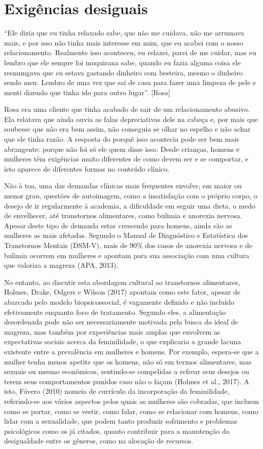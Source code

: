 \section{Exigências desiguais}

``Ele dizia que eu tinha relaxado sabe, que não me cuidava, não me arrumava mais, e por isso não tinha mais interesse em mim, que eu acabei com o nosso relacionamento. Realmente isso aconteceu, eu relaxei, parei de me cuidar, mas eu lembro que ele sempre foi muquirana sabe, quando eu fazia alguma coisa ele resmungava que eu estava gastando dinheiro com besteira, mesmo o dinheiro sendo meu. Lembro de uma vez que sai de casa para fazer uma limpeza de pele e menti dizendo que tinha ido para outro lugar''. [Rosa]

Rosa era uma cliente que tinha acabado de sair de um relacionamento abusivo. Ela relatava que ainda ouvia as falas depreciativas dele na cabeça e, por mais que soubesse que não era bem assim, não conseguia se olhar no espelho e não achar que ele tinha razão. A resposta do porquê isso acontecia pode ser bem mais abrangente: porque não foi só ele quem disse isso. Desde crianças, homens e mulheres têm exigências muito diferentes de como devem ser e se comportar, e isto aparece de diferentes formas no conteúdo clínico. 

Não à toa, uma das demandas clínicas mais frequentes envolve, em maior ou menor grau, questões de autoimagem, como a insatisfação com o próprio corpo, o desejo de ir regularmente à academia, a dificuldade em seguir uma dieta, o medo de envelhecer, até transtornos alimentares, como bulimia e anorexia nervosa. Apesar deste tipo de demanda estar crescendo para homens, ainda são as mulheres as mais afetadas. Segundo o Manual de Diagnóstico e Estatística dos Transtornos Mentais (DSM-V), mais de 90\% dos casos de anorexia nervosa e de bulimia ocorrem em mulheres e apontam para sua associação com uma cultura que valoriza a magreza (APA, 2013).

No entanto, ao discutir esta abordagem cultural ao transtornos alimentares, Holmes, Drake, Odgers e Wilson (2017) apontam como este fator, apesar de abarcado pelo modelo biopsicossocial, é vagamente definido e não incluído efetivamente enquanto foco de tratamento. Segundo eles, a alimentação desordenada pode não ser necessariamente motivada pela busca do ideal de magreza, mas também por experiências mais amplas que envolvem as expectativas sociais acerca da feminilidade, o que explicaria a grande lacuna existente entre a prevalência em mulheres e homens. Por exemplo, espera-se que a mulher tenha menos apetite que os homens, não só em termos alimentares, mas sexuais ou mesmo econômicos, sentindo-se compelidas a refrear seus desejos ou terem seus comportamentos punidos caso não o façam (Holmes et al., 2017). A isto, Fávero (2010) nomeia de currículo da incorporação da feminilidade, referindo-se aos vários aspectos pelos quais as mulheres são cobradas, que incluem como se portar, como se vestir, como falar, como se relacionar com homens, como lidar com a sexualidade, que podem tanto produzir sofrimento e problemas psicológicos como os já citados, quanto contribuir para a manutenção da desigualdade entre os gêneros, como na alocação de recursos.

